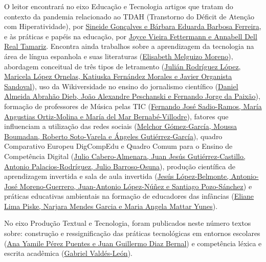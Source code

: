 \documentclass{textolivre}
\begin{document}
O leitor encontrará no eixo Educação e Tecnologia artigos que tratam do contexto da pandemia relacionado ao TDAH (Transtorno do Déficit de Atenção com Hiperatividade), por \href{https://doi.org/10.35699/1983-3652.2021.25043}{Sineide Gonçalves e Bárbara Eduarda Barbosa Ferreira}, e às práticas e papéis na educação, por \href{https://doi.org/10.35699/1983-3652.2021.24941}{Joyce Vieira Fettermann e Annabell Dell Real Tamariz}. Encontra ainda trabalhos sobre a aprendizagem da tecnologia na área de língua espanhola e suas literaturas (\href{https://doi.org/10.35699/1983-3652.2021.26394}{Elisabeth Melguizo Moreno}), abordagem conceitual de três tipos de letramento (\href{https://doi.org/10.35699/1983-3652.2021.29513}{Julián Rodríguez López, Maricela López Ornelas, Katiuska Fernández Morales e Javier Organista Sandoval}), uso da Wikiversidade no ensino do jornalismo científico (\href{https://doi.org/10.35699/1983-3652.2021.24935}{Daniel Almeida Abrahão Dieb, João Alexandre Peschanski e Fernando Jorge da Paixão}), formação de professores de Música pelas TIC (\href{https://doi.org/10.35699/1983-3652.2021.25419}{Fernando José Sadio-Ramos, María Angustias Ortiz-Molina e María del Mar Bernabé-Villodre}), fatores que influenciam a utilização das redes sociais (\href{https://doi.org/10.35699/1983-3652.2021.25420}{Melchor Gómez-García, Moussa Boumadan, Roberto Soto-Varela e Ángeles Gutiérrez-García}), quadro Comparativo Europeu DigCompEdu e Quadro Comum para o Ensino de Competência Digital (\href{https://doi.org/10.35699/1983-3652.2021.25740}{Julio Cabero-Almenara, Juan Jesús Gutiérrez-Castillo, Antonio Palacios-Rodríguez, Julio Barroso-Osuna}), produção científica de aprendizagem invertida e sala de aula invertida (\href{https://doi.org/10.35699/1983-3652.2021.26266}{Jesús López-Belmonte, Antonio-José Moreno-Guerrero, Juan-Antonio López-Núñez e Santiago Pozo-Sánchez}) e práticas educativas ambientais na formação de educadores das infâncias (\href{	https://doi.org/10.35699/1983-3652.2021.25698}{Eliane Lima Piske, Narjara Mendes Garcia e Maria Angela Mattar Yunes}).

No eixo Produção Textual e Tecnologia, foram publicados neste número textos sobre: construção e ressignificação das práticas tecnológicas em entornos escolares (\href{https://doi.org/10.35699/1983-3652.2021.29523}{Ana Yamile Pérez Puentes e Juan Guillermo Diaz Bernal}) e competência léxica e escrita acadêmica (\href{https://doi.org/10.35699/1983-3652.2021.24560}{Gabriel Valdés-León}).
\end{document}
